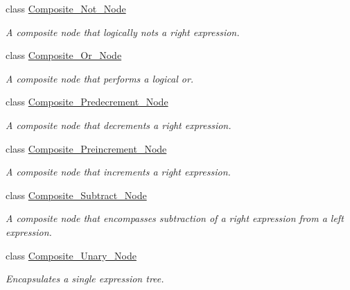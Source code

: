 \begin{DoxyCompactItemize}
class \hyperlink{classMadara_1_1Expression__Tree_1_1Composite__Not__Node}{Composite\_\-Not\_\-Node}
\begin{DoxyCompactList}\small\item\em A composite node that logically nots a right expression. \item\end{DoxyCompactList}\item 
class \hyperlink{classMadara_1_1Expression__Tree_1_1Composite__Or__Node}{Composite\_\-Or\_\-Node}
\begin{DoxyCompactList}\small\item\em A composite node that performs a logical or. \item\end{DoxyCompactList}\item 
class \hyperlink{classMadara_1_1Expression__Tree_1_1Composite__Predecrement__Node}{Composite\_\-Predecrement\_\-Node}
\begin{DoxyCompactList}\small\item\em A composite node that decrements a right expression. \item\end{DoxyCompactList}\item 
class \hyperlink{classMadara_1_1Expression__Tree_1_1Composite__Preincrement__Node}{Composite\_\-Preincrement\_\-Node}
\begin{DoxyCompactList}\small\item\em A composite node that increments a right expression. \item\end{DoxyCompactList}\item 
class \hyperlink{classMadara_1_1Expression__Tree_1_1Composite__Subtract__Node}{Composite\_\-Subtract\_\-Node}
\begin{DoxyCompactList}\small\item\em A composite node that encompasses subtraction of a right expression from a left expression. \item\end{DoxyCompactList}\item 
class \hyperlink{classMadara_1_1Expression__Tree_1_1Composite__Unary__Node}{Composite\_\-Unary\_\-Node}
\begin{DoxyCompactList}\small\item\em Encapsulates a single expression tree. \item\end{DoxyCompactList}\item 

\end{DoxyCompactItemize}
